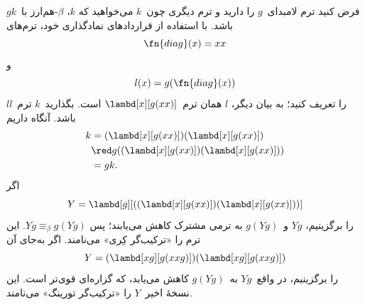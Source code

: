 \documentclass[../../../include/open-logic-section]{subfiles}
\begin{document}

فرض کنید ترم لامبدای~$g$ را دارید و ترم دیگری چون~$k$ می‌خواهید که
$k$، $\beta$-هم‌ارز با~$gk$ باشد. با استفاده از قراردادهای نمادگذاری خود،
ترم‌های
\[
\fn{diag}(x) = xx
\]
و
\[
l(x) = g(\fn{diag}(x))
\]
را تعریف کنید؛ به بیان دیگر، $l$ همان ترم~$\lambd[x][g(xx)]$ است.
بگذارید~$k$ ترم~$ll$ باشد. آنگاه داریم
\begin{align*}
k & = (\lambd[x][g(xx)])(\lambd[x][g(xx)]) \\
& \red  g((\lambd[x][g(xx)])(\lambd[x][g(xx)])) \\
& = gk.
\end{align*}
اگر
\[
Y = \lambd[g][((\lambd[x][g(xx)])(\lambd[x][g(xx)]))]
\]
را برگزینیم، $Yg$ و~$g(Yg)$ به ترمی مشترک کاهش می‌یابند؛ پس
$Yg \equiv_\beta g(Yg)$. این ترم را «ترکیب‌گر کِری» می‌نامند. اگر
به‌جای آن
\[
Y = (\lambd[xg][g(xxg)])(\lambd[xg][g(xxg)])
\]
را برگزینیم، در واقع~$Yg$ به~$g(Yg)$ کاهش می‌یابد، که گزاره‌ای قوی‌تر
است. این نسخهٔ اخیر~$Y$ را «ترکیب‌گر تورینگ» می‌نامند.
\end{document}
